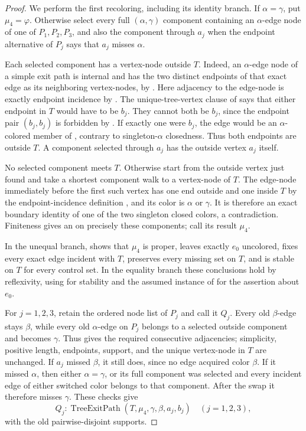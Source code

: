 \begin{proof}
We perform the first recoloring, including its identity branch.  If
$\alpha=\gamma$, put $\mu_4=\varphi$.  Otherwise select every full
$(\alpha,\gamma)$ component containing an $\alpha$-edge node of one of
$P_1,P_2,P_3$, and also the component through $a_j$ when the endpoint
alternative of $P_j$ says that $a_j$ misses $\alpha$.

Each selected component has a vertex-node outside $T$.  Indeed, an
$\alpha$-edge node of a simple exit path is internal and has the two
distinct endpoints of that exact edge as its neighboring vertex-nodes,
by .  Here adjacency to the edge-node
is exactly endpoint incidence by .  The
unique-tree-vertex clause of  says that either
endpoint in $T$ would have to be $b_j$.  They cannot both be $b_j$,
since the endpoint pair $(b_j,b_j)$ is forbidden by
.  If exactly one were $b_j$, the edge
would be an $\alpha$-colored member of
, contrary to singleton-$\alpha$ closedness.
Thus both endpoints are outside $T$.  A component selected through
$a_j$ has the outside vertex $a_j$ itself.

No selected component meets $T$.  Otherwise start from the outside
vertex just found and take a shortest component walk to a vertex-node
of $T$.  The edge-node immediately before the first such vertex has one
end outside and one inside $T$ by the endpoint-incidence definition
, and its color is $\alpha$ or $\gamma$.  It is
therefore an exact boundary identity of one of the two singleton closed
colors, a contradiction.  Finiteness gives an
 on precisely these components; call its
result $\mu_4$.

In the unequal branch,  shows that
$\mu_4$ is proper, leaves exactly $e_0$ uncolored, fixes every exact edge
incident with $T$, preserves every missing set on $T$, and is stable on
$T$ for every control set.  In the equality branch these conclusions
hold by reflexivity, using  for stability and the assumed
instance of  for the assertion about $e_0$.

For $j=1,2,3$, retain the ordered node list of $P_j$ and call it $Q_j$.
Every old $\beta$-edge stays $\beta$, while every old $\alpha$-edge on
$P_j$ belongs to a selected outside component and becomes $\gamma$.
Thus  gives the required consecutive
adjacencies; simplicity, positive length, endpoints, support, and the
unique vertex-node in $T$ are unchanged.  If $a_j$ missed $\beta$, it
still does, since no edge acquired color $\beta$.  If it missed
$\alpha$, then either $\alpha=\gamma$, or its full component was selected
and every incident edge of either switched color belongs to that
component.  After the swap it therefore misses $\gamma$.  These checks
give
\[
 Q_j:\operatorname{TreeExitPath}(T,\mu_4,\gamma,\beta,a_j,b_j)
 \quad(j=1,2,3),                                               \tag{4}
\]
with the old pairwise-disjoint supports.


\end{proof}
